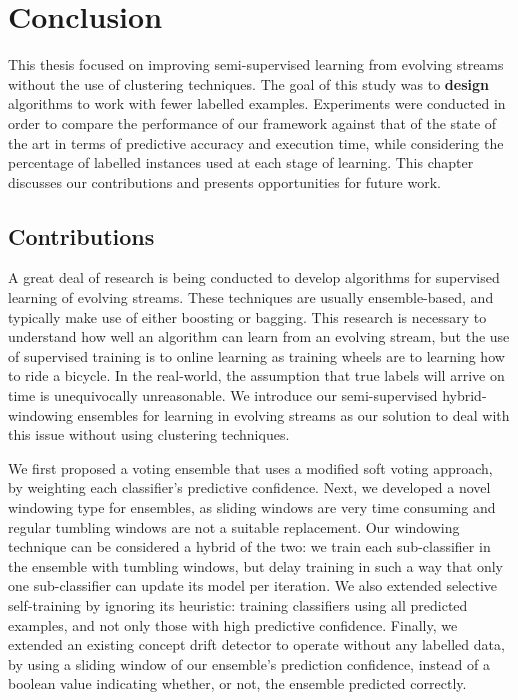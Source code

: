 
\chapter{Conclusion\label{chapter:conclusion}} %


This thesis focused on improving semi-supervised learning from evolving streams without the use of clustering techniques. The goal of this study was to \textbf{design} algorithms to work with fewer labelled examples. Experiments were conducted in order to compare the performance of our framework against that of the state of the art in terms of predictive accuracy and execution time, while considering the percentage of labelled instances used at each stage of learning. This chapter discusses our contributions and presents opportunities for future work.

 
\section{Contributions}
A great deal of research is being conducted to develop algorithms for supervised learning of evolving streams. These techniques are usually ensemble-based, and typically make use of either boosting or bagging. This research is necessary to understand how well an algorithm can learn from an evolving stream, but the use of supervised training is to online learning as training wheels are to learning how to ride a bicycle. In the real-world, the assumption that true labels will arrive on time is unequivocally unreasonable. We introduce our semi-supervised hybrid-windowing ensembles for learning in evolving streams as our solution to deal with this issue without using clustering techniques.

We first proposed a voting ensemble that uses a modified soft voting approach, by weighting each classifier’s predictive confidence. Next, we developed a novel windowing type for ensembles, as sliding windows are very time consuming and regular tumbling windows are not a suitable replacement. Our windowing technique can be considered a hybrid of the two: we train each sub-classifier in the ensemble with tumbling windows, but delay training in such a way that only one sub-classifier can update its model per iteration. We also extended selective self-training by ignoring its heuristic: training classifiers using all predicted examples, and not only those with high predictive confidence. Finally, we extended an existing concept drift detector to operate without any labelled data, by using a sliding window of our ensemble’s prediction confidence, instead of a boolean value indicating whether, or not, the ensemble predicted correctly.

